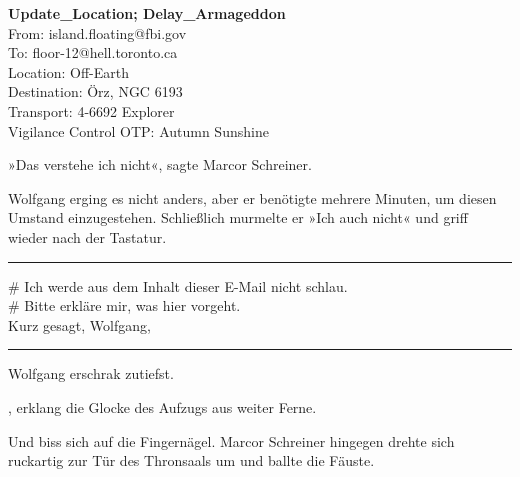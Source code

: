 \begin{itshape}

\noindent \textbf{Update\_Location; Delay\_Armageddon}\\
\noindent From: island.floating@fbi.gov\\
\noindent To: floor-12@hell.toronto.ca\\
\noindent Location: Off-Earth\\
\noindent Destination: Örz, NGC 6193\\
\noindent Transport: 4-6692 Explorer\\
\noindent Vigilance Control OTP: Autumn Sunshine

\end{itshape}

»Das verstehe ich nicht«, sagte Marcor Schreiner.

Wolfgang erging es nicht anders, aber er benötigte mehrere Minuten, um diesen Umstand einzugestehen. Schließlich murmelte er »Ich auch nicht« und griff wieder nach der Tastatur.

\noindent \parbox{\textwidth}{ \vspace{3ex} \hrule \vspace{3ex}

    \begin{footnotesize}
    \begin{ttfamily}

\noindent \# Ich werde aus dem Inhalt dieser E-Mail nicht schlau.\\
\noindent \# Bitte erkläre mir, was hier vorgeht.\\
\noindent Kurz gesagt, Wolfgang,

    \end{ttfamily}
    \end{footnotesize}

\vspace{3ex} \hrule \vspace{3ex} }

Wolfgang erschrak zutiefst.

, erklang die Glocke des Aufzugs aus weiter Ferne.

Und biss sich auf die Fingernägel. Marcor Schreiner hingegen drehte sich ruckartig zur Tür des Thronsaals um und ballte die Fäuste.

